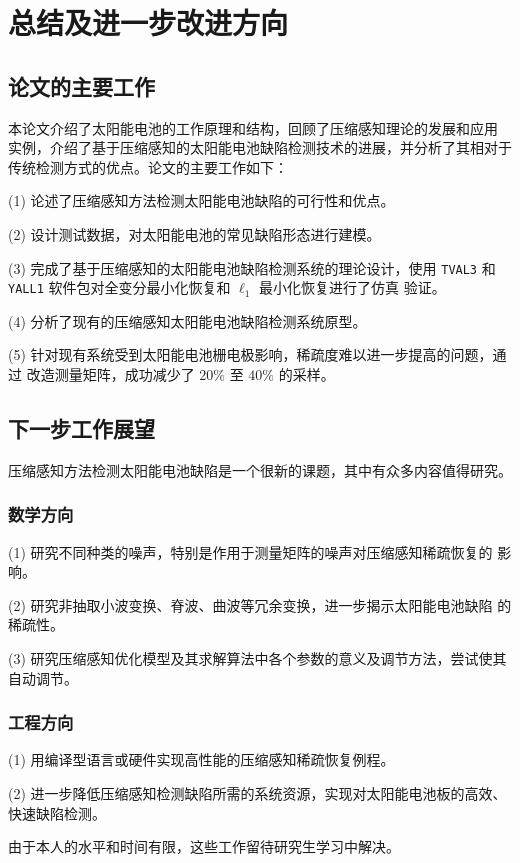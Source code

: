\chapter{总结及进一步改进方向}

\section{论文的主要工作}

本论文介绍了太阳能电池的工作原理和结构，回顾了压缩感知理论的发展和应用
实例，介绍了基于压缩感知的太阳能电池缺陷检测技术的进展，并分析了其相对于
传统检测方式的优点。论文的主要工作如下：

(1) 论述了压缩感知方法检测太阳能电池缺陷的可行性和优点。

(2) 设计测试数据，对太阳能电池的常见缺陷形态进行建模。

(3) 完成了基于压缩感知的太阳能电池缺陷检测系统的理论设计，使用 \verb|TVAL3|
和 \verb|YALL1| 软件包对全变分最小化恢复和 $\ell_1$ 最小化恢复进行了仿真
验证。

(4) 分析了现有的压缩感知太阳能电池缺陷检测系统原型。

(5) 针对现有系统受到太阳能电池栅电极影响，稀疏度难以进一步提高的问题，通过
改造测量矩阵，成功减少了 $20\%$ 至 $40\%$ 的采样。

\section{下一步工作展望}

压缩感知方法检测太阳能电池缺陷是一个很新的课题，其中有众多内容值得研究。

\subsection{数学方向}

(1) 研究不同种类的噪声，特别是作用于测量矩阵的噪声对压缩感知稀疏恢复的
影响。

(2) 研究非抽取小波变换、脊波、曲波等冗余变换，进一步揭示太阳能电池缺陷
的稀疏性。

(3) 研究压缩感知优化模型及其求解算法中各个参数的意义及调节方法，尝试使其
自动调节。

\subsection{工程方向}

(1) 用编译型语言或硬件实现高性能的压缩感知稀疏恢复例程。

(2) 进一步降低压缩感知检测缺陷所需的系统资源，实现对太阳能电池板的高效、
快速缺陷检测。

由于本人的水平和时间有限，这些工作留待研究生学习中解决。
